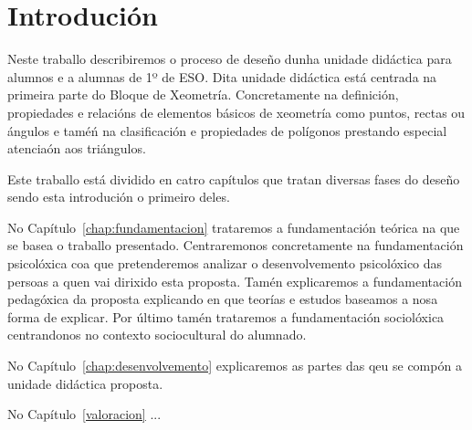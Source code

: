 % 

\chapter[Introdución]{Introdución}
Neste traballo describiremos o proceso de deseño dunha unidade didáctica para alumnos e a alumnas de 1º de ESO. Dita unidade didáctica está centrada na primeira parte do Bloque de Xeometría. Concretamente na definición, propiedades e relacións de elementos básicos de xeometría como puntos, rectas ou ángulos e taméń na clasificación e propiedades de polígonos prestando especial atenciaón aos triángulos.

Este traballo está dividido en catro capítulos que tratan diversas fases do deseño sendo esta introdución o primeiro deles.

No Capítulo~\ref{chap:fundamentacion} trataremos a fundamentación teórica na que se basea o traballo presentado. Centraremonos concretamente na fundamentación psicolóxica coa que pretenderemos analizar o desenvolvemento psicolóxico das persoas a quen vai dirixido esta proposta. Tamén explicaremos a fundamentación pedagóxica da proposta explicando en que teorías e estudos baseamos a nosa forma de explicar. Por último tamén trataremos a fundamentación sociolóxica centrandonos no contexto sociocultural do alumnado.

No Capítulo~\ref{chap:desenvolvemento} explicaremos as partes das qeu se compón a unidade didáctica proposta.

No Capítulo~\ref{valoracion} ...